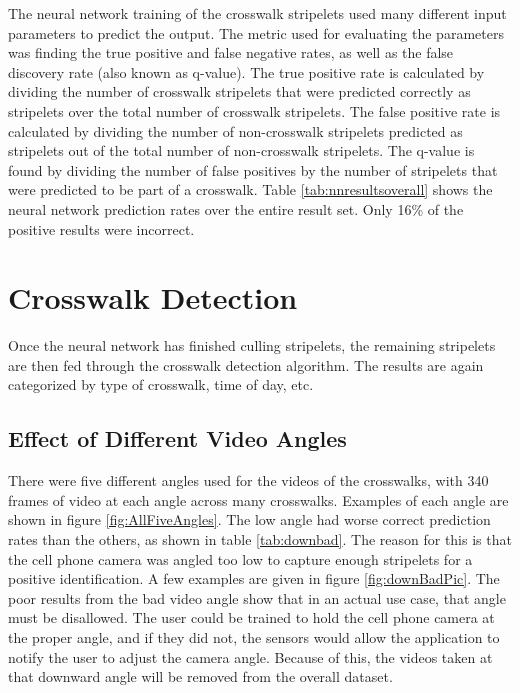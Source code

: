 \documentclass[12pt]{ucthesis}
\begin{document}
The neural network training of the crosswalk stripelets used many different input parameters to predict the output. The metric used for evaluating the parameters was finding the true positive and false negative rates, as well as the false discovery rate (also known as q-value). The true positive rate is calculated by dividing the number of crosswalk stripelets that were predicted correctly as stripelets over the total number of crosswalk stripelets. The false positive rate is calculated by dividing the number of non-crosswalk stripelets predicted as stripelets out of the total number of non-crosswalk stripelets. The q-value is found by dividing the number of false positives by the number of stripelets that were predicted to be part of a crosswalk. Table \ref{tab:nnresultsoverall} shows the neural network prediction rates over the entire result set. Only 16\% of the positive results were incorrect. 
    




\section{Crosswalk Detection}
Once the neural network has finished culling stripelets, the remaining stripelets are then fed through the crosswalk detection algorithm. The results are again categorized by type of crosswalk, time of day, etc. 

\subsection{Effect of Different Video Angles}

There were five different angles used for the videos of the crosswalks, with 340 frames of video at each angle across many crosswalks. Examples of each angle are shown in figure \ref{fig:AllFiveAngles}. The low angle had worse correct prediction rates than the others, as shown in table \ref{tab:downbad}. The reason for this is that the cell phone camera was angled too low to capture enough stripelets for a positive identification. A few examples are given in figure \ref{fig:downBadPic}. The poor results from the bad video angle show that in an actual use case, that angle must be disallowed. The user could be trained to hold the cell phone camera at the proper angle, and if they did not, the sensors would allow the application to notify the user to adjust the camera angle. Because of this, the videos taken at that downward angle will be removed from the overall dataset. 
\end{document}
